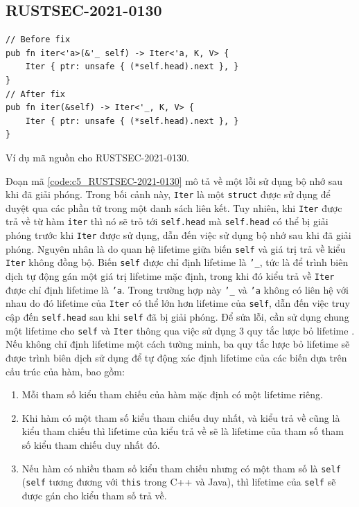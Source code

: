 \subsection{RUSTSEC-2021-0130}

\begin{listing}[H]
\begin{verbatim}
// Before fix
pub fn iter<'a>(&'_ self) -> Iter<'a, K, V> {
    Iter { ptr: unsafe { (*self.head).next }, }
}
// After fix
pub fn iter(&self) -> Iter<'_, K, V> {
    Iter { ptr: unsafe { (*self.head).next }, }
}
\end{verbatim}
\caption{Ví dụ mã nguồn cho RUSTSEC-2021-0130.}
\label{code:c5_RUSTSEC-2021-0130}
\end{listing}


Đoạn mã \ref{code:c5_RUSTSEC-2021-0130} mô tả về một lỗi sử dụng bộ nhớ sau khi đã giải phóng.
Trong bối cảnh này, \texttt{Iter} là một \texttt{struct} được sử dụng để duyệt qua các phần tử trong một danh sách liên kết.
Tuy nhiên, khi \texttt{Iter} được trả về từ hàm \texttt{iter} thì nó sẽ trỏ tới \texttt{self.head} mà \texttt{self.head} có thể bị giải phóng trước khi \texttt{Iter} được sử dụng, dẫn đến việc sử dụng bộ nhớ sau khi đã giải phóng.
Nguyên nhân là do quan hệ lifetime giữa biến \texttt{self} và giá trị trả về kiểu \texttt{Iter} không đồng bộ.
Biến \texttt{self} được chỉ định lifetime là \texttt{'\_}, tức là để trình biên dịch tự động gán một giá trị lifetime mặc định, trong khi đó kiểu trả về \texttt{Iter} được chỉ định lifetime là \texttt{'a}.
Trong trường hợp này \texttt{'\_} và \texttt{'a} không có liên hệ với nhau do đó lifetime của \texttt{Iter} có thể lớn hơn lifetime của \texttt{self}, dẫn đến việc truy cập đến \texttt{self.head} sau khi \texttt{self} đã bị giải phóng.
Để sửa lỗi, cần sử dụng chung một lifetime cho \texttt{self} và \texttt{Iter} thông qua việc sử dụng 3 quy tắc lược bỏ lifetime \cite{rustlangLifetimeElision}.
Nếu không chỉ định lifetime một cách tường minh, ba quy tắc lược bỏ lifetime sẽ được trình biên dịch sử dụng để tự động xác định lifetime của các biến dựa trên cấu trúc của hàm, bao gồm:

\begin{enumerate}
    \item Mỗi tham số kiểu tham chiếu của hàm mặc định có một lifetime riêng.
    \item Khi hàm có một tham số kiểu tham chiếu duy nhất, và kiểu trả về cũng là kiểu tham chiếu thì lifetime của kiểu trả về sẽ là lifetime của tham số tham số kiểu tham chiếu duy nhất đó.
    \item Nếu hàm có nhiều tham số kiểu tham chiếu nhưng có một tham số là \texttt{self} (\texttt{self} tương đương với \texttt{this} trong C++ và Java), thì lifetime của \texttt{self} sẽ được gán cho kiểu tham số trả về.
\end{enumerate}

